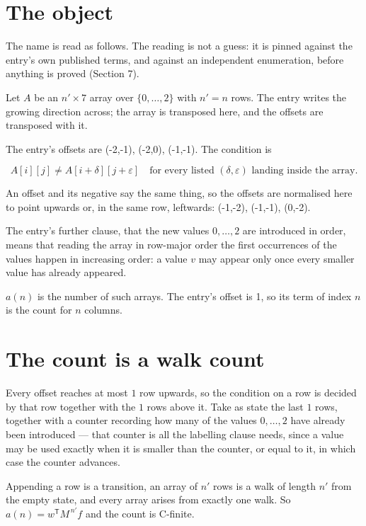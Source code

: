 \documentclass[11pt]{article}
\theoremstyle{definition}
\begin{document}
\section{The object}

The name is read as follows. The reading is not a guess: it is pinned against the entry's own published terms, and against an independent enumeration, before anything is proved (Section 7).

Let $A$ be an $n' \times 7$ array over $\{0,\dots,2\}$ with $n' = n$ rows. The entry writes the growing direction across; the array is transposed here, and the offsets are transposed with it.

The entry's offsets are (-2,-1), (-2,0), (-1,-1). The condition is

\[A[i][j] \ne A[i{+}\delta][j{+}\varepsilon]\quad\text{for every listed }(\delta,\varepsilon)\text{ landing inside the array.}\]

An offset and its negative say the same thing, so the offsets are normalised here to point upwards or, in the same row, leftwards: (-1,-2), (-1,-1), (0,-2).

The entry's further clause, that the new values $0,\dots,2$ are introduced in order, means that reading the array in row-major order the first occurrences of the values happen in increasing order: a value $v$ may appear only once every smaller value has already appeared.

$a(n)$ is the number of such arrays. The entry's offset is 1, so its term of index $n$ is the count for $n$ columns.

\section{The count is a walk count}

Every offset reaches at most $1$ row upwards, so the condition on a row is decided by that row together with the $1$ rows above it. Take as state the last $1$ rows, together with a counter recording how many of the values $0,\dots,2$ have already been introduced --- that counter is all the labelling clause needs, since a value may be used exactly when it is smaller than the counter, or equal to it, in which case the counter advances.

Appending a row is a transition, an array of $n'$ rows is a walk of length $n'$ from the empty state, and every array arises from exactly one walk. So $a(n) = w^{\mathsf T}M^{\,n'}f$ and the count is C-finite.
\end{document}
